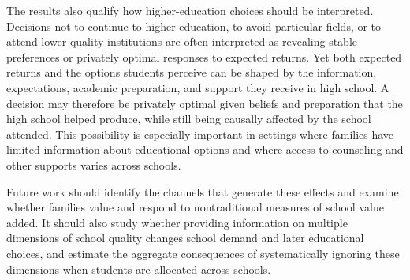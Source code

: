 \documentclass[a4paper, article, english, oneside, unknownkeysallowed, 12pt]{memoir}
\begin{document}
The results also qualify how higher-education choices should be interpreted.
Decisions not to continue to higher education, to avoid particular fields, or to attend lower-quality institutions are often interpreted as revealing stable preferences or privately optimal responses to expected returns.
Yet both expected returns and the options students perceive can be shaped by the information, expectations, academic preparation, and support they receive in high school.
A decision may therefore be privately optimal given beliefs and preparation that the high school helped produce, while still being causally affected by the school attended.
This possibility is especially important in settings where families have limited information about educational options and where access to counseling and other supports varies across schools.

Future work should identify the channels that generate these effects and examine whether families value and respond to nontraditional measures of school value added.
It should also study whether providing information on multiple dimensions of school quality changes school demand and later educational choices, and estimate the aggregate consequences of systematically ignoring these dimensions when students are allocated across schools.

\clearpage
\printbibliography
\end{document}

